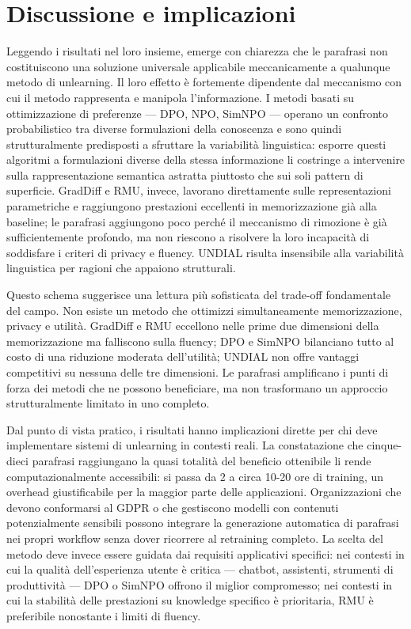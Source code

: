 \documentclass[12pt,a4paper]{article}
\begin{document}
\section{Discussione e implicazioni}

Leggendo i risultati nel loro insieme, emerge con chiarezza che le parafrasi non costituiscono una soluzione universale applicabile meccanicamente a qualunque metodo di unlearning. Il loro effetto è fortemente dipendente dal meccanismo con cui il metodo rappresenta e manipola l'informazione. I metodi basati su ottimizzazione di preferenze — DPO, NPO, SimNPO — operano un confronto probabilistico tra diverse formulazioni della conoscenza e sono quindi strutturalmente predisposti a sfruttare la variabilità linguistica: esporre questi algoritmi a formulazioni diverse della stessa informazione li costringe a intervenire sulla rappresentazione semantica astratta piuttosto che sui soli pattern di superficie. GradDiff e RMU, invece, lavorano direttamente sulle representazioni parametriche e raggiungono prestazioni eccellenti in memorizzazione già alla baseline; le parafrasi aggiungono poco perché il meccanismo di rimozione è già sufficientemente profondo, ma non riescono a risolvere la loro incapacità di soddisfare i criteri di privacy e fluency. UNDIAL risulta insensibile alla variabilità linguistica per ragioni che appaiono strutturali.

Questo schema suggerisce una lettura più sofisticata del trade-off fondamentale del campo. Non esiste un metodo che ottimizzi simultaneamente memorizzazione, privacy e utilità. GradDiff e RMU eccellono nelle prime due dimensioni della memorizzazione ma falliscono sulla fluency; DPO e SimNPO bilanciano tutto al costo di una riduzione moderata dell'utilità; UNDIAL non offre vantaggi competitivi su nessuna delle tre dimensioni. Le parafrasi amplificano i punti di forza dei metodi che ne possono beneficiare, ma non trasformano un approccio strutturalmente limitato in uno completo.

Dal punto di vista pratico, i risultati hanno implicazioni dirette per chi deve implementare sistemi di unlearning in contesti reali. La constatazione che cinque-dieci parafrasi raggiungano la quasi totalità del beneficio ottenibile li rende computazionalmente accessibili: si passa da 2 a circa 10-20 ore di training, un overhead giustificabile per la maggior parte delle applicazioni. Organizzazioni che devono conformarsi al GDPR o che gestiscono modelli con contenuti potenzialmente sensibili possono integrare la generazione automatica di parafrasi nei propri workflow senza dover ricorrere al retraining completo. La scelta del metodo deve invece essere guidata dai requisiti applicativi specifici: nei contesti in cui la qualità dell'esperienza utente è critica — chatbot, assistenti, strumenti di produttività — DPO o SimNPO offrono il miglior compromesso; nei contesti in cui la stabilità delle prestazioni su knowledge specifico è prioritaria, RMU è preferibile nonostante i limiti di fluency.
\end{document}
